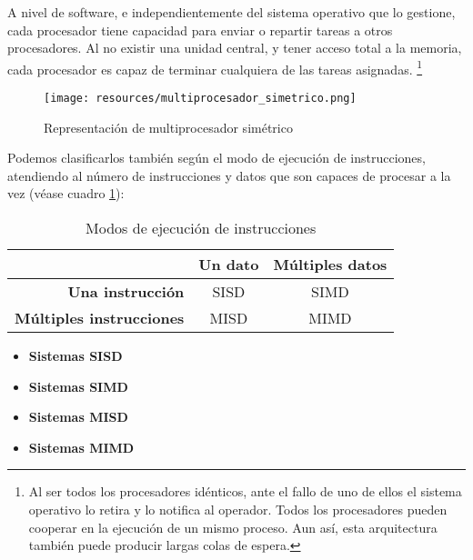 \documentclass[a4paper, 11pt, titlepage]{article}
\begin{document}
\begin{itemize}
            A nivel de software, e independientemente del sistema operativo que lo gestione, 
            cada procesador tiene capacidad para enviar o repartir tareas a otros procesadores. 
            Al no existir una unidad central, y tener acceso total a la memoria, cada procesador 
            es capaz de terminar cualquiera de las tareas asignadas. \footnote{
                Al ser todos los procesadores idénticos, ante el fallo de uno de ellos el sistema 
                operativo lo retira y lo notifica al operador. Todos los procesadores pueden cooperar
                en la ejecución de un mismo proceso. Aun así, esta arquitectura también puede producir 
                largas colas de espera.
            }

            \begin{figure}[htp]
                \centering
                \texttt{[image: resources/multiprocesador\_simetrico.png]}
                \caption{Representación de multiprocesador simétrico}
                \label{multiprocesador_simetrico}
            \end{figure}
        \end{itemize}

        Podemos clasificarlos también según el modo de ejecución de instrucciones, atendiendo al 
        número de instrucciones y datos que son capaces de procesar a la vez (véase cuadro 
        \ref{modoejecucioninstrucciones}):

        \begin{table}[htp]
            \centering
            \caption{Modos de ejecución de instrucciones}
            \label{modoejecucioninstrucciones}
            \begin{tabular}{rcc}
                \hline
                & \textbf{Un dato} & \textbf{Múltiples datos} \\ \hline
                \textbf{Una instrucción} & SISD & SIMD \\ \hline
                \textbf{Múltiples instrucciones} & MISD & MIMD \\ \hline
            \end{tabular}
        \end{table}

        \begin{itemize}
            \item \textbf{Sistemas SISD}
            \item \textbf{Sistemas SIMD}
            \item \textbf{Sistemas MISD}
            \item \textbf{Sistemas MIMD}
        \end{itemize}
\end{document}
